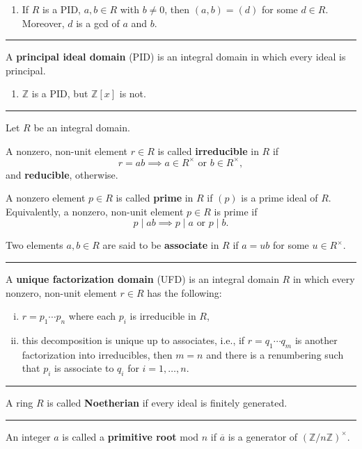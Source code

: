 \documentclass[12pt]{article}
\newcommand{\keyword}[1]{\textbf{#1}}
\newcommand{\sepline}{\rule{\textwidth}{0.4pt}}
\theoremstyle{definition}
\newcommand{\Z}{\mathbb{Z}}
\newcommand{\<}{\left\langle}
\renewcommand{\>}{\right\rangle}
\newcommand{\eqc}{\overline}
\newcommand{\divides}{\mid}
\begin{document}
\begin{enumerate}
    \item If $R$ is a PID, $a, b \in R$ with $b \ne 0$, then $(a, b) = (d)$ for some $d \in R$. Moreover, $d$ is a gcd of $a$ and $b$.
\end{enumerate}

\sepline

A \keyword{principal ideal domain} (PID) is an integral domain in which every ideal is principal.

\begin{enumerate}
    \item $\Z$ is a PID, but $\Z[x]$ is not.
\end{enumerate}

\sepline

Let $R$ be an integral domain.

A nonzero, non-unit element $r \in R$ is called \keyword{irreducible} in $R$ if
\[
    r = ab \implies a \in R^\times \text{ or } b \in R^\times,
\]
and \keyword{reducible}, otherwise.

A nonzero element $p \in R$ is called \keyword{prime} in $R$ if $(p)$ is a prime ideal of $R$. Equivalently, a nonzero, non-unit element $p \in R$ is prime  if
\[
    p \divides ab \implies p \divides a \text{ or } p \divides b.
\]

Two elements $a, b \in R$ are said to be \keyword{associate} in $R$ if $a = ub$ for some $u \in R^\times$.

\sepline

A \keyword{unique factorization domain} (UFD) is an integral domain $R$ in which every nonzero, non-unit element $r \in R$ has the following:
\begin{enumerate}[(i)]
    \item $r = p_1 \cdots p_n$ where each $p_i$ is irreducible in $R$,
    \item this decomposition is unique up to associates, i.e., if $r = q_1 \cdots q_m$ is another factorization into irreducibles, then $m = n$ and there is a renumbering such that $p_i$ is associate to $q_i$ for $i = 1, \dots, n$.
\end{enumerate}

\sepline

A ring $R$ is called \keyword{Noetherian} if every ideal is finitely generated.

\sepline

An integer $a$ is called a \keyword{primitive root} mod $n$ if $\eqc{a}$ is a generator of $(\Z/n\Z)^\times$.
\end{document}
